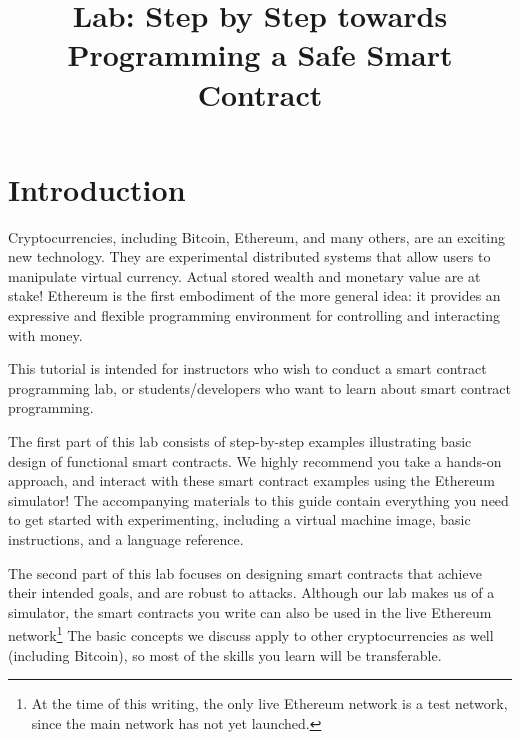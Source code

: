\documentclass[12pt]{article}
\begin{document}
\title{Lab: Step by Step towards Programming a Safe Smart Contract}


\maketitle

\setcounter{tocdepth}{5}
\tableofcontents

\section{Introduction}

Cryptocurrencies, including Bitcoin, Ethereum, and many others, are an exciting new technology. They are experimental distributed systems that allow users to manipulate virtual currency. Actual stored wealth and monetary value are at stake! Ethereum is the first embodiment of the more general idea: it provides an expressive and flexible programming environment for controlling and interacting with money.

This tutorial is intended for instructors
who wish to conduct a smart  
contract programming lab, or students/developers
who want to learn about smart contract programming.

The first part of this lab consists of step-by-step examples illustrating basic design of functional smart contracts. We highly recommend you take a hands-on approach, and interact with these smart contract examples using the Ethereum simulator! The accompanying materials to this guide contain everything you need to get started with experimenting, including  a virtual machine image, basic instructions, and a language reference.

The second part of this lab focuses on designing smart contracts that achieve their intended goals, and are robust to attacks. 
Although our lab makes us of a simulator, the smart contracts you write can also be used in the live Ethereum network\footnote{At the time of this writing, the only live Ethereum network is a test network, since the main network has not yet launched.} The basic concepts we discuss apply to other cryptocurrencies as well (including Bitcoin), so most of the skills you learn will be transferable.
\end{document}
